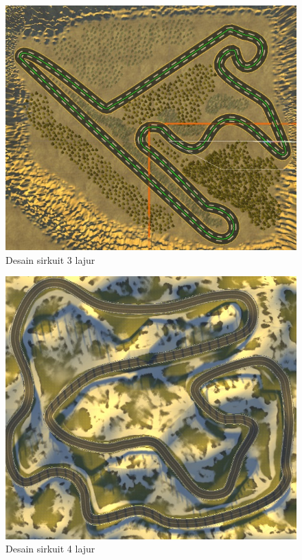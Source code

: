\begin{figure}  [!htb]
	\captionsetup{justification=centering}
	\includegraphics[scale=0.53]{img/3lj_oh.jpg}
	\caption{Desain sirkuit 3 lajur}
	\label{fig: 3_5}
\end{figure}
\vspace{1ex}

\begin{figure}  [!htb]
	\captionsetup{justification=centering}
	\includegraphics[scale=0.53]{img/4lj_oh.jpg}
	\caption{Desain sirkuit 4 lajur}
	\label{fig: 3_6}
\end{figure}
\vspace{1ex}

